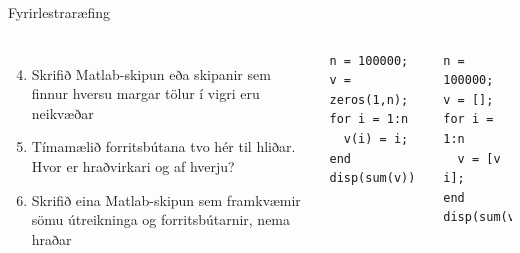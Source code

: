 \documentclass{beamer}
\begin{document}
\begin{frame}[fragile]{Fyrirlestraræfing}
\vspace{\baselineskip}
\begin{columns}
\begin{enumerate}
    \setcounter{enumi}{3}
     \item Skrifið Matlab-skipun eða skipanir sem finnur hversu margar tölur í vigri eru neikvæðar
     \item Tímamælið forritsbútana tvo hér til hliðar. Hvor er hraðvirkari og af hverju?
     \item Skrifið eina Matlab-skipun sem framkvæmir sömu útreikninga og forritsbútarnir, nema hraðar
\end{enumerate}
\begin{verbatim}
n = 100000; v = zeros(1,n);
for i = 1:n
  v(i) = i;
end
disp(sum(v))
\end{verbatim}
\begin{verbatim}
n = 100000;  v = [];
for i = 1:n
  v = [v i];
end
disp(sum(v))
\end{verbatim}

\end{columns}

\end{frame}
\end{document}

